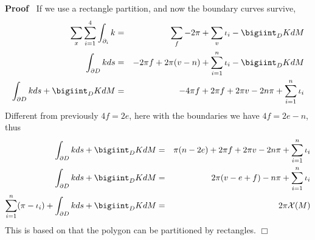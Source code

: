 \documentclass{article}
\newenvironment{proof}{\noindent\textbf{Proof\ }}{\hspace*{\fill}$\Box$\medskip}
\begin{document}
\begin{proof}
  If we use a rectangle partition, and now the boundary curves survive,
  \begin{eqnarray*}
    \sum_x \sum_{i = 1}^4 \int_{\partial_i} k & = & \sum_f - 2 \pi + \sum_v
    \iota_i - \bigiint_D K d M\\
    \int_{\partial D} k d s & = & - 2 \pi f + 2 \pi (v - n) + \sum_{i = 1}^n
    \iota_i - \bigiint_D K d M\\
    \int_{\partial D} k d s + \bigiint_D K d M & = & - 4 \pi f + 2 \pi f + 2
    \pi v - 2 n \pi + \sum_{i = 1}^n \iota_i
  \end{eqnarray*}
  Different from previously $4 f = 2 e$, here with the boundaries we have $4 f
  = 2 e - n$, thus
  \begin{eqnarray*}
    \int_{\partial D} k d s + \bigiint_D K d M & = & \pi (n - 2 e) + 2 \pi f +
    2 \pi v - 2 n \pi + \sum_{i = 1}^n \iota_i\\
    \int_{\partial D} k d s + \bigiint_D K d M & = & 2 \pi (v - e + f) - n \pi
    + \sum_{i = 1}^n \iota_i\\
    \sum_{i = 1}^n (\pi - \iota_i) + \int_{\partial D} k d s + \bigiint_D K d
    M & = & 2 \pi \mathcal{X} (M)
  \end{eqnarray*}
  This is based on that the polygon can be partitioned by rectangles.
\end{proof}

{}
\end{document}
